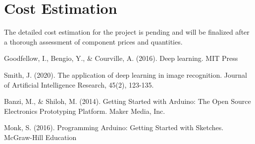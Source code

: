 \documentclass[12pt,a4paper]{report}
\begin{document}
\section*{Cost Estimation}
The detailed cost estimation for the project is pending and will be finalized after a thorough assessment of component prices and quantities.  

\newpage
\pagestyle{plain}
\renewcommand{\bibname}{References}

\begin{thebibliography}{35}
Goodfellow, I., Bengio, Y., \& Courville, A. (2016). Deep learning. MIT Press

Smith, J. (2020). The application of deep learning in image recognition. Journal of Artificial Intelligence Research, 45(2), 123-135.

 Banzi, M., \& Shiloh, M. (2014). Getting Started with Arduino: The Open Source Electronics Prototyping Platform. Maker Media, Inc.

Monk, S. (2016). Programming Arduino: Getting Started with Sketches. McGraw-Hill Education

\end{thebibliography}
\end{document}
